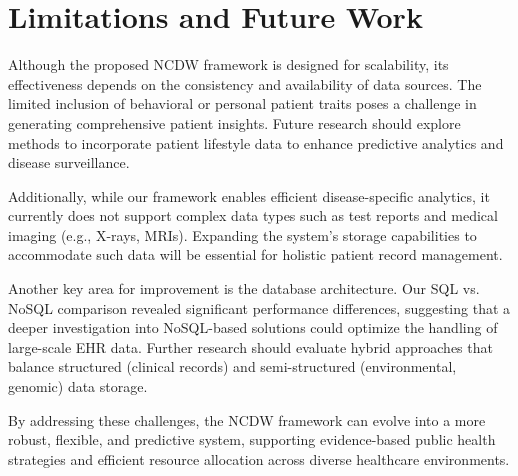 \section{Limitations and Future Work}
Although the proposed NCDW framework is designed for scalability, its effectiveness depends on the consistency and availability of data sources. The limited inclusion of behavioral or personal patient traits poses a challenge in generating comprehensive patient insights. Future research should explore methods to incorporate patient lifestyle data to enhance predictive analytics and disease surveillance.

Additionally, while our framework enables efficient disease-specific analytics, it currently does not support complex data types such as test reports and medical imaging (e.g., X-rays, MRIs). Expanding the system’s storage capabilities to accommodate such data will be essential for holistic patient record management.

Another key area for improvement is the database architecture. Our SQL vs. NoSQL comparison revealed significant performance differences, suggesting that a deeper investigation into NoSQL-based solutions could optimize the handling of large-scale EHR data. Further research should evaluate hybrid approaches that balance structured (clinical records) and semi-structured (environmental, genomic) data storage. 

By addressing these challenges, the NCDW framework can evolve into a more robust, flexible, and predictive system, supporting evidence-based public health strategies and efficient resource allocation across diverse healthcare environments.